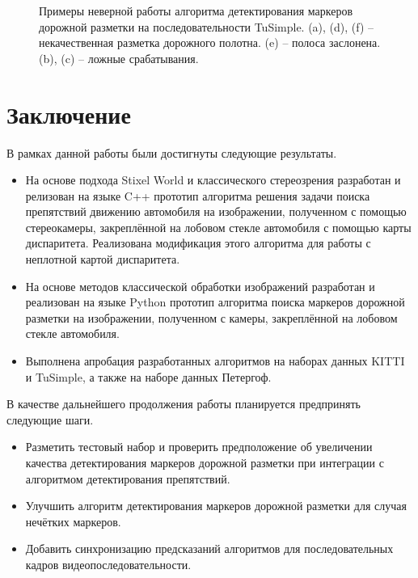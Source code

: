 \documentclass[aps,%
14pt,%
final,%
oneside,
onecolumn,%
musixtex, %
superscriptaddress,%
centertags]{extarticle} %
\begin{document}
\begin{figure}[htp]
\caption{Примеры неверной работы алгоритма детектирования маркеров дорожной разметки на последовательности TuSimple. (a), (d), (f) -- некачественная разметка дорожного полотна. (e) -- полоса заслонена. (b), (c) -- ложные срабатывания.}
\label{fig:lane_det_fails}
\end{figure}

\newpage
\section{Заключение}

В рамках данной работы были достигнуты следующие результаты.

\begin{itemize}
\item На основе подхода Stixel World и классического стереозрения разработан и релизован на языке C++ прототип алгоритма решения задачи поиска препятствий движению автомобиля на изображении, полученном с помощью стереокамеры, закреплённой на лобовом стекле автомобиля с помощью карты диспаритета. Реализована модификация этого алгоритма для работы с неплотной картой диспаритета.

\item На основе методов классической обработки изображений разработан и реализован на языке Python прототип алгоритма поиска маркеров дорожной разметки на изображении, полученном с камеры, закреплённой на лобовом стекле автомобиля.

\item Выполнена апробация разработанных алгоритмов на наборах данных KITTI и TuSimple, а также на наборе данных Петергоф.

\end{itemize}

В качестве дальнейшего продолжения работы планируется предпринять следующие шаги.

\begin{itemize}
\item Разметить тестовый набор и проверить предположение об увеличении качества детектирования маркеров дорожной разметки при интеграции с алгоритмом детектирования препятствий.
\item Улучшить алгоритм детектирования маркеров дорожной разметки для случая нечётких маркеров.
\item Добавить синхронизацию предсказаний алгоритмов для последовательных кадров видеопоследовательности.
\end{itemize}

\newpage



\end{document}
